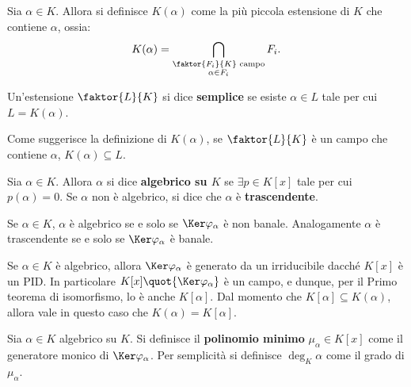 \documentclass[12pt]{scrartcl}
\begin{document}
	\begin{definition}
		Sia $\alpha \in K$. Allora si definisce $K(\alpha)$
		come la più piccola estensione di $K$ che contiene
		$\alpha$, ossia:
		\[ K(\alpha) = \bigcap_{\substack{\faktor{F_i}{K} \text{ campo}	\\ \alpha \in F_i}} F_i. \]
	\end{definition}

	\begin{definition}
		Un'estensione $\faktor{L}{K}$ si dice \textbf{semplice}
		se esiste $\alpha \in L$ tale per cui $L = K(\alpha)$.
	\end{definition}

	\begin{remark}
		Come suggerisce la definizione di $K(\alpha)$, se
		$\faktor{L}{K}$ è un campo che contiene $\alpha$,
		$K(\alpha) \subseteq L$.
	\end{remark}

	\begin{definition}
		Sia $\alpha \in K$. Allora $\alpha$ si dice \textbf{algebrico su $K$} se $\exists p \in K[x]$
		tale per cui $p(\alpha) = 0$. Se $\alpha$ non è
		algebrico, si dice che $\alpha$ è \textbf{trascendente}.
	\end{definition}

	\begin{remark}
		Se $\alpha \in K$, $\alpha$ è algebrico se e solo
		se $\Ker \varphi_\alpha$ è non banale. Analogamente
		$\alpha$ è trascendente se e solo se $\Ker \varphi_\alpha$ è banale.
	\end{remark}

	\begin{remark}
		Se $\alpha \in K$ è algebrico, allora $\Ker \varphi_\alpha$ è generato da un irriducibile dacché
		$K[x]$ è un PID. In particolare $K[x] \quot {\Ker \varphi_\alpha}$ è un campo, e dunque, per il Primo
		teorema di isomorfismo, lo è anche $K[\alpha]$.
		Dal momento che $K[\alpha] \subseteq K(\alpha)$,
		allora vale in questo caso che $K(\alpha) = K[\alpha]$.
	\end{remark}

	\begin{definition}
		Sia $\alpha \in K$ algebrico su $K$. Si definisce il \textbf{polinomio minimo}
		$\mu_\alpha \in K[x]$ come il generatore monico di
		$\Ker \varphi_\alpha$. Per semplicità si definisce
		$\deg_K \alpha$ come il grado di $\mu_\alpha$. 
	\end{definition}
\end{document}
